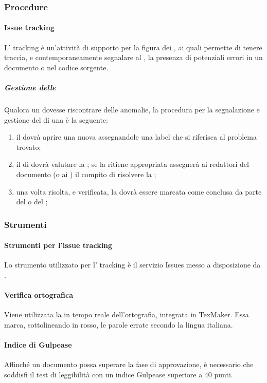 \subsubsection{Procedure}
\paragraph{Issue tracking}
L' tracking è un'attività di supporto per la figura dei \VERP, ai quali permette di tenere traccia, e contemporaneamente segnalare al \RESP, la presenza di potenziali errori in un documento o nel codice sorgente.
 \subparagraph{Gestione delle }
Qualora un \VER{} dovesse riscontrare delle anomalie, la procedura per la segnalazione e gestione del  di una  è la seguente:
\begin{enumerate}
	\item il \VER{} dovrà aprire una nuova  assegnandole una label che si riferisca al problema trovato;
	\item il \RESP{} di  dovrà valutare la ; se la ritiene appropriata assegnerà ai redattori del documento (o ai \PRP) il compito di risolvere la ;
	\item una volta risolta, e verificata, la  dovrà essere marcata come conclusa da parte del \RESP{} o del \VER;
\end{enumerate}
\subsubsection{Strumenti}
\paragraph{Strumenti per l'issue tracking}
Lo strumento utilizzato per l' tracking è il servizio Issues messo a disposizione da .
\paragraph{Verifica ortografica}
Viene utilizzata la  in tempo reale dell'ortografia, integrata in TexMaker. Essa marca,
sottolineando in rosso, le parole errate secondo la lingua italiana.
\paragraph{Indice di Gulpease}
Affinché un documento possa superare la fase di approvazione, è necessario che soddisfi il test di leggibilità con un indice Gulpease superiore a 40 punti.
